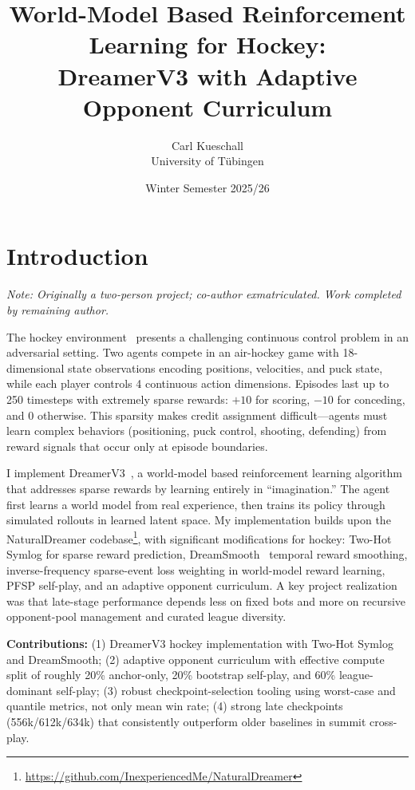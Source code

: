 \documentclass[11pt]{article}
\title{World-Model Based Reinforcement Learning for Hockey:\\
        DreamerV3 with Adaptive Opponent Curriculum}
\author{Carl Kueschall\\
        University of T\"ubingen}
\date{Winter Semester 2025/26}
\begin{document}
\maketitle

\section{Introduction}\label{sec:intro}

\textit{Note: Originally a two-person project; co-author exmatriculated. Work completed by remaining author.}

\medskip
The hockey environment~\cite{martius2024} presents a challenging continuous control problem in an adversarial setting. Two agents compete in an air-hockey game with 18-dimensional state observations encoding positions, velocities, and puck state, while each player controls 4 continuous action dimensions. Episodes last up to 250 timesteps with extremely sparse rewards: $+10$ for scoring, $-10$ for conceding, and $0$ otherwise. This sparsity makes credit assignment difficult---agents must learn complex behaviors (positioning, puck control, shooting, defending) from reward signals that occur only at episode boundaries.

I implement DreamerV3~\cite{hafner2024}, a world-model based reinforcement learning algorithm that addresses sparse rewards by learning entirely in ``imagination.'' The agent first learns a world model from real experience, then trains its policy through simulated rollouts in learned latent space. My implementation builds upon the NaturalDreamer codebase\footnote{\url{https://github.com/InexperiencedMe/NaturalDreamer}}, with significant modifications for hockey: Two-Hot Symlog for sparse reward prediction, DreamSmooth~\cite{dreamsmooth2023} temporal reward smoothing, inverse-frequency sparse-event loss weighting in world-model reward learning, PFSP self-play, and an adaptive opponent curriculum. A key project realization was that late-stage performance depends less on fixed bots and more on recursive opponent-pool management and curated league diversity.

\textbf{Contributions:} (1) DreamerV3 hockey implementation with Two-Hot Symlog and DreamSmooth; (2) adaptive opponent curriculum with effective compute split of roughly 20\% anchor-only, 20\% bootstrap self-play, and 60\% league-dominant self-play; (3) robust checkpoint-selection tooling using worst-case and quantile metrics, not only mean win rate; (4) strong late checkpoints (556k/612k/634k) that consistently outperform older baselines in summit cross-play.
\end{document}
